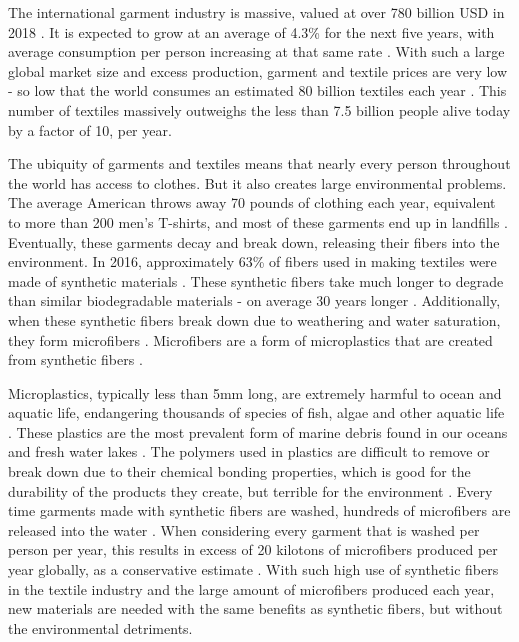 \documentclass{article}
\begin{document}
The international garment industry is massive, valued at over 780 billion USD in 2018 \autocite{shenglufashion}. It is expected to grow at an average of 4.3\% for the next five years, with average consumption per person increasing at that same rate \autocite{shenglufashion}\autocite{grandviewresearch}. With such a large global market size and excess production, garment and textile prices are very low - so low that the world consumes an estimated 80 billion textiles each year \autocite{shenglufashion}\autocite{grandviewresearch}. This number of textiles massively outweighs the less than 7.5 billion people alive today by a factor of 10, per year\autocite{grandviewresearch}.

The ubiquity of garments and textiles means that nearly every person throughout the world has access to clothes. But it also creates large environmental problems. The average American throws away 70 pounds of clothing each year, equivalent to more than 200 men's T-shirts, and most of these garments end up in landfills \autocite{shenglufashion}\autocite{grandviewresearch}. Eventually, these garments decay and break down, releasing their fibers into the environment. In 2016, approximately 63\% of fibers used in making textiles were made of synthetic materials \autocite{ihsmarkit}. These synthetic fibers take much longer to degrade than similar biodegradable materials - on average 30 years longer \autocite{ihsmarkit}. Additionally, when these synthetic fibers break down due to weathering and water saturation, they form microfibers \autocite{quantifyingfibers}. Microfibers are a form of microplastics that are created from synthetic fibers \autocite{quantifyingfibers}.

Microplastics, typically less than 5mm long, are extremely harmful to ocean and aquatic life, endangering thousands of species of fish, algae and other aquatic life \autocite{gesamp}. These plastics are the most prevalent form of marine debris found in our oceans and fresh water lakes \autocite{noaamicroplastics}\autocite{iucn}. The polymers used in plastics are difficult to remove or break down due to their chemical bonding properties, which is good for the durability of the products they create, but terrible for the environment \autocite{microplasticrelease}. Every time garments made with synthetic fibers are washed, hundreds of microfibers are released into the water \autocite{microplasticrelease}. When considering every garment that is washed per person per year, this results in excess of 20 kilotons of microfibers produced per year globally, as a conservative estimate \autocite{microplasticpollutionlitreview}. With such high use of synthetic fibers in the textile industry and the large amount of microfibers produced each year, new materials are needed with the same benefits as synthetic fibers, but without the environmental detriments.
\end{document}
